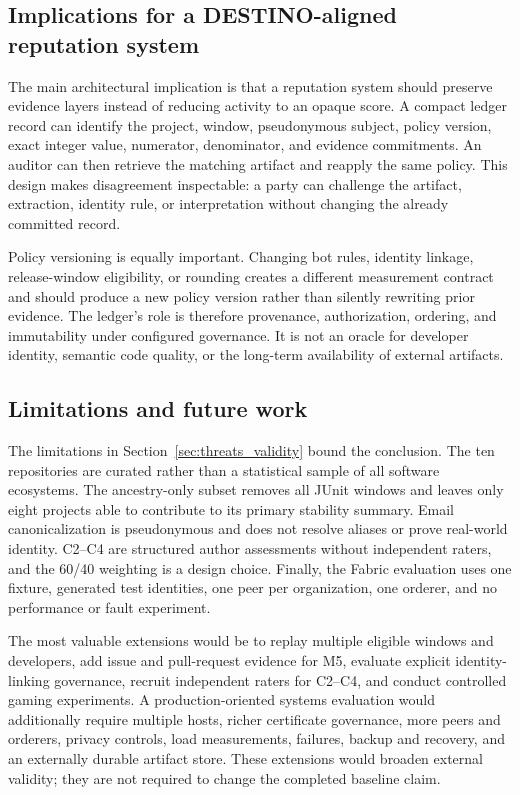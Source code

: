 \subsection{Implications for a DESTINO-aligned reputation system}
\label{sec:final_implications}

The main architectural implication is that a reputation system should preserve evidence layers instead of reducing activity
to an opaque score. A compact ledger record can identify the project, window, pseudonymous subject, policy version, exact
integer value, numerator, denominator, and evidence commitments. An auditor can then retrieve the matching artifact and
reapply the same policy. This design makes disagreement inspectable: a party can challenge the artifact, extraction,
identity rule, or interpretation without changing the already committed record.

Policy versioning is equally important. Changing bot rules, identity linkage, release-window eligibility, or rounding creates
a different measurement contract and should produce a new policy version rather than silently rewriting prior evidence. The
ledger's role is therefore provenance, authorization, ordering, and immutability under configured governance. It is not an
oracle for developer identity, semantic code quality, or the long-term availability of external artifacts.

\subsection{Limitations and future work}
\label{sec:final_future_work}

The limitations in Section~\ref{sec:threats_validity} bound the conclusion. The ten repositories are curated rather than a
statistical sample of all software ecosystems. The ancestry-only subset removes all JUnit windows and leaves only eight
projects able to contribute to its primary stability summary. Email canonicalization is pseudonymous and does not resolve
aliases or prove real-world identity. C2--C4 are structured author assessments without independent raters, and the 60/40
weighting is a design choice. Finally, the Fabric evaluation uses one fixture, generated test identities, one peer per
organization, one orderer, and no performance or fault experiment.

The most valuable extensions would be to replay multiple eligible windows and developers, add issue and pull-request evidence
for M5, evaluate explicit identity-linking governance, recruit independent raters for C2--C4, and conduct controlled gaming
experiments. A production-oriented systems evaluation would additionally require multiple hosts, richer certificate
governance, more peers and orderers, privacy controls, load measurements, failures, backup and recovery, and an externally
durable artifact store. These extensions would broaden external validity; they are not required to change the completed
baseline claim.

